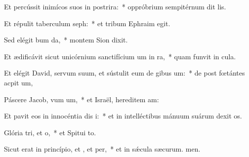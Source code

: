 \item Et percússit inimícos suos in postrira:~* oppróbrium sempitérnum dit lis.
\item Et répulit taberculum seph:~* et tribum Ephraim  egit.
\item Sed elégit bum da,~* montem Sion  dixit.
\item Et ædificávit sicut unicórnium sanctifícium um in ra,~* quam funvit in cula.
\item Et elégit David, servum suum, et sústulit eum de gibus um:~* de post fœtántes acpit um,
\item Páscere Jacob, vum um,~* et Israël, hereditem am:
\item Et pavit eos in innocéntia dis i:~* et in intelléctibus mánuum suárum dexit os.
\item Glória tri, et o,~* et Spitui to.
\item Sicut erat in princípio, et , et per,~* et in sǽcula sæcurum. men.
